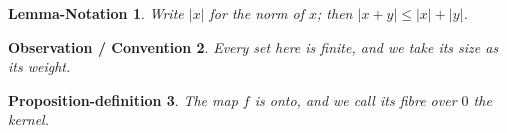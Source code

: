 \documentclass{article}
\newtheorem{lemnot}{Lemma-Notation}
\newtheorem{obscon}[lemnot]{Observation / Convention}
\newtheorem{propdef}[lemnot]{Proposition-definition}
\begin{document}
\begin{lemnot}
Write $|x|$ for the norm of $x$; then $|x+y|\le|x|+|y|$.
\end{lemnot}
\begin{obscon}
Every set here is finite, and we take its size as its weight.
\end{obscon}
\begin{propdef}
The map $f$ is onto, and we call its fibre over $0$ the kernel.
\end{propdef}
\end{document}
